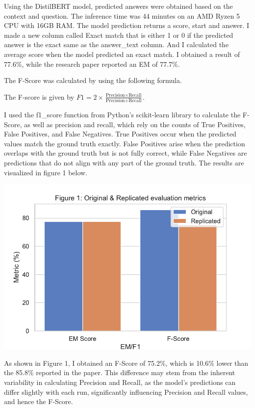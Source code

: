 \documentclass[
  11pt,
]{article}
\begin{document}
Using the DistilBERT model, predicted answers were obtained based on the
context and question. The inference time was 44 minutes on an AMD Ryzen
5 CPU with 16GB RAM. The model prediction returns a score, start and
answer. I made a new column called Exact match that is either 1 or 0 if
the predicted answer is the exact same as the answer\_text column. And I
calculated the average score when the model predicted an exact match. I
obtained a result of 77.6\%, while the research paper reported an EM of
77.7\%.

The F-Score was calculated by using the following formula.

The F-score is given by
\(F1 = 2 \times \frac{\text{Precision} \times \text{Recall}}{\text{Precision} + \text{Recall}}\).

I used the f1\_score function from Python's scikit-learn library to
calculate the F-Score, as well as precision and recall, which rely on
the counts of True Positives, False Positives, and False Negatives. True
Positives occur when the predicted values match the ground truth
exactly. False Positives arise when the prediction overlaps with the
ground truth but is not fully correct, while False Negatives are
predictions that do not align with any part of the ground truth. The
results are visualized in figure 1 below.

\includegraphics{Final-Report_files/figure-latex/squad_visualization-difference-1.pdf}

As shown in Figure 1, I obtained an F-Score of 75.2\%, which is 10.6\%
lower than the 85.8\% reported in the paper. This difference may stem
from the inherent variability in calculating Precision and Recall, as
the model's predictions can differ slightly with each run, significantly
influencing Precision and Recall values, and hence the F-Score.
\end{document}
